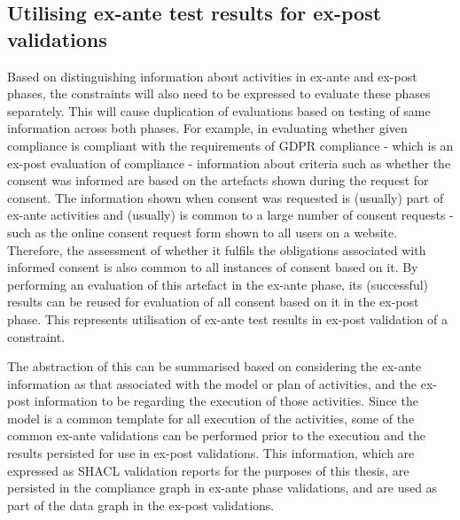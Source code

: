 \subsection{Utilising ex-ante test results for ex-post validations}\label{sec:testing:shacl:combine}
Based on distinguishing information about activities in ex-ante and ex-post phases, the constraints will also need to be expressed to evaluate these phases separately.
This will cause duplication of evaluations based on testing of same information across both phases. 
For example, in evaluating whether given compliance is compliant with the requirements of GDPR compliance - which is an ex-post evaluation of compliance - information about criteria such as whether the consent was informed are based on the artefacts shown during the request for consent. The information shown when consent was requested is (usually) part of ex-ante activities and (usually) is common to a large number of consent requests - such as the online consent request form shown to all users on a website. Therefore, the assessment of whether it fulfils the obligations associated with informed consent is also common to all instances of consent based on it. 
By performing an evaluation of this artefact in the ex-ante phase, its (successful) results can be reused for evaluation of all consent based on it in the ex-post phase.
This represents utilisation of ex-ante test results in ex-post validation of a constraint.

The abstraction of this can be summarised based on considering the ex-ante information as that associated with the model or plan of activities, and the ex-post information to be regarding the execution of those activities. Since the model is a common template for all execution of the activities, some of the common ex-ante validations can be performed prior to the execution and the results persisted for use in ex-post validations.
This information, which are expressed as SHACL validation reports for the purposes of this thesis, are persisted in the compliance graph in ex-ante phase validations, and are used as part of the data graph in the ex-post validations.

